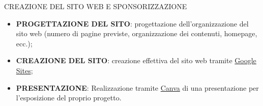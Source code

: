 \documentclass[aspectratio=1610]{beamer}
\begin{document}
\begin{frame}{CREAZIONE DEL SITO WEB E SPONSORIZZAZIONE}
    \begin{itemize}
        \item \textbf{PROGETTAZIONE DEL SITO}: progettazione dell'organizzazione del sito web 
        (numero di pagine previste, organizzazione dei contenuti, homepage, ecc.);
        \pause
        \item \textbf{CREAZIONE DEL SITO}: creazione effettiva del sito web tramite \href{https://sites.google.com/}{Google Sites};
        \pause
        \item \textbf{PRESENTAZIONE}: Realizzazione tramite \href{https://www.canva.com/}{Canva} di una presentazione 
        per l'esposizione del proprio progetto. 
    \end{itemize}
\end{frame}
\end{document}
